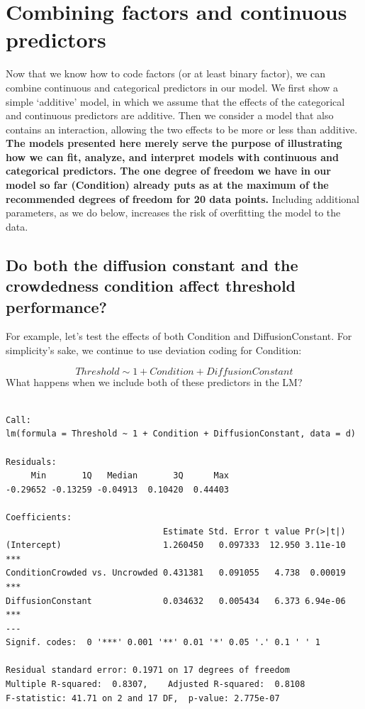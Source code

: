 \documentclass[
]{article}
\begin{document}
\hypertarget{combining-factors-and-continuous-predictors}{%
\section{Combining factors and continuous
predictors}\label{combining-factors-and-continuous-predictors}}

Now that we know how to code factors (or at least binary factor), we can
combine continuous and categorical predictors in our model. We first
show a simple `additive' model, in which we assume that the effects of
the categorical and continuous predictors are additive. Then we consider
a model that also contains an interaction, allowing the two effects to
be more or less than additive. \textbf{The models presented here merely
serve the purpose of illustrating how we can fit, analyze, and interpret
models with continuous and categorical predictors. The one degree of
freedom we have in our model so far (Condition) already puts as at the
maximum of the recommended degrees of freedom for 20 data points.}
Including additional parameters, as we do below, increases the risk of
overfitting the model to the data.

\hypertarget{do-both-the-diffusion-constant-and-the-crowdedness-condition-affect-threshold-performance}{%
\subsection{Do both the diffusion constant and the crowdedness condition
affect threshold
performance?}\label{do-both-the-diffusion-constant-and-the-crowdedness-condition-affect-threshold-performance}}

For example, let's test the effects of both Condition and
DiffusionConstant. For simplicity's sake, we continue to use deviation
coding for Condition:

\[ Threshold \sim 1 + Condition + DiffusionConstant \] What happens when
we include both of these predictors in the LM?

\footnotesize

\begin{verbatim}

Call:
lm(formula = Threshold ~ 1 + Condition + DiffusionConstant, data = d)

Residuals:
     Min       1Q   Median       3Q      Max 
-0.29652 -0.13259 -0.04913  0.10420  0.44403 

Coefficients:
                               Estimate Std. Error t value Pr(>|t|)    
(Intercept)                    1.260450   0.097333  12.950 3.11e-10 ***
ConditionCrowded vs. Uncrowded 0.431381   0.091055   4.738  0.00019 ***
DiffusionConstant              0.034632   0.005434   6.373 6.94e-06 ***
---
Signif. codes:  0 '***' 0.001 '**' 0.01 '*' 0.05 '.' 0.1 ' ' 1

Residual standard error: 0.1971 on 17 degrees of freedom
Multiple R-squared:  0.8307,    Adjusted R-squared:  0.8108 
F-statistic: 41.71 on 2 and 17 DF,  p-value: 2.775e-07
\end{verbatim}
\end{document}

